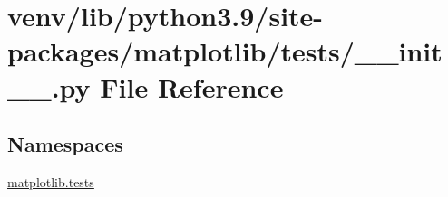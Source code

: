\hypertarget{venv_2lib_2python3_89_2site-packages_2matplotlib_2tests_2____init_____8py}{}\section{venv/lib/python3.9/site-\/packages/matplotlib/tests/\+\_\+\+\_\+init\+\_\+\+\_\+.py File Reference}
\label{venv_2lib_2python3_89_2site-packages_2matplotlib_2tests_2____init_____8py}
\subsection*{Namespaces}
\begin{DoxyCompactItemize}
\item 
 \hyperlink{namespacematplotlib_1_1tests}{matplotlib.\+tests}
\end{DoxyCompactItemize}
